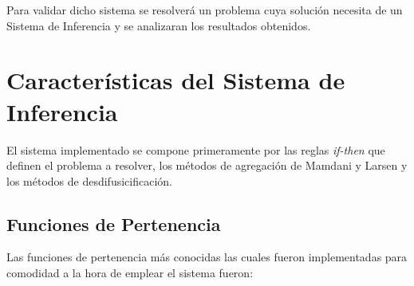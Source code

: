 \documentclass[a4paper,10pt,twocolumn]{article}
\begin{document}
Para validar dicho sistema se resolver\'a un problema cuya soluci\'on necesita de un Sistema de Inferencia y se analizaran los resultados obtenidos. 

\section*{Caracter\'isticas del Sistema de Inferencia }

El sistema implementado se compone primeramente por las reglas \textit{if-then} que definen el problema a resolver, los m\'etodos de agregaci\'on de Mamdani y Larsen y los m\'etodos de desdifusicificaci\'on.

\subsection*{Funciones de Pertenencia}

Las funciones de pertenencia m\'as conocidas las cuales fueron implementadas para comodidad a la hora de emplear el sistema fueron:
\end{document}
